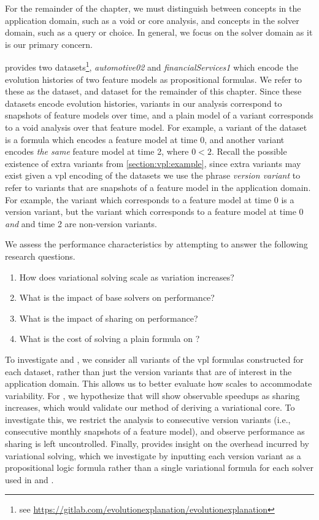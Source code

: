 \label{section:case-studies:experimental-methodology}
%
For the remainder of the chapter, we must distinguish between concepts in the
application domain, such as a void or core analysis, and concepts in the solver
domain, such as a query or choice. In general, we focus on the solver domain as
it is our primary concern.

\nieke{} provides two datasets\footnote{see
  \url{https://gitlab.com/evolutionexplanation/evolutionexplanation}},
\textit{automotive02} and \textit{financialServices1} which encode the evolution
histories of two feature models as propositional formulas. We refer to these as
the \auto{} dataset, and \fin{} dataset for the remainder of this chapter. Since
these datasets encode evolution histories, variants in our analysis correspond
to snapshots of feature models over time, and a plain model of a variant
corresponds to a void analysis over that feature model. For example, a variant
of the \auto{} dataset is a \pl{} formula which encodes a feature model at time
0, and another variant encodes \emph{the same} feature model at time 2, where $0
< 2$. Recall the possible existence of extra variants from
\autoref{section:vpl:example}, since extra variants may exist given a \ac{vpl}
encoding of the datasets we use the phrase \textit{version variant} to refer to
variants that are snapshots of a feature model in the application domain. For
example, the variant which corresponds to a feature model at time 0 is a version
variant, but the variant which corresponds to a feature model at time 0
\emph{and} and time 2 are non-version variants.

We assess the performance characteristics \vsat{} by attempting to answer the
following research questions.
%
\begin{enumerate}%
\item[\resQ{1}] How does variational solving scale as variation increases?
\item[\resQ{2}] What is the impact of base solvers on performance?
\item[\resQ{3}] What is the impact of sharing on performance?
\item[\resQ{4}] What is the cost of solving a plain formula on \vsat{}?
\end{enumerate}

To investigate  and , we consider all variants of the \ac{vpl}
formulas constructed for each dataset, rather than just the version variants
that are of interest in the application domain. This allows us to better
evaluate how \vsat{} scales to accommodate variability.
%
For , we hypothesize that \vsat{} will show observable speedups as
sharing increases, which would validate our method of deriving a variational
core. To investigate this, we restrict the analysis to consecutive version
variants (i.e., consecutive monthly snapshots of a feature model), and observe
performance as sharing is left uncontrolled.
%
Finally,  provides insight on the overhead incurred by variational
solving, which we investigate by inputting each version variant as a
propositional logic formula rather than a single variational formula for each
solver used in  and .


